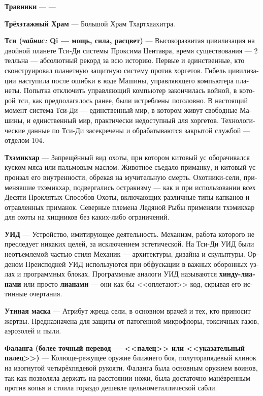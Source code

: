 \documentclass[a4paper,12pt,fleqn]{book}\usepackage{cooltooltips}\usepackage{polyglossia}\setdefaultlanguage[babelshorthands=true]{russian}\setotherlanguage{english}\defaultfontfeatures{Ligatures=TeX,Mapping=tex-text} \usepackage{xcolor}\definecolor{lightgray}{HTML}{bbbbbb}\color{lightgray}\newcommand{\ml}[3]{\textenglish{\textcolor{black}{#3}}}
\newcommand{\theterm}[3]{\textbf{\hypertarget{#1}{#2}} --- #3}
\newcommand{\theorigin}[3]{\textit{#1:} #2 --- #3}
\begin{document}
{\theterm{grasshider}
{Травники}
{---}

\theterm{three-storey-temple} %
{Трёхэтажный Храм}
{Большой Храм Тхартхаахитра.}

\theterm{qi-people}
{Тси (\theorigin{чайнис}{Qi}{мощь, сила, расцвет})}
{Высокоразвитая цивилизация на двойной планете Тси-Ди системы Проксима Центавра, время существования --- 2 телльна --- абсолютный рекорд за всю историю.
Первые и единственные, кто сконструировал планетную защитную систему против хоргетов.
Гибель цивилизации наступила после ошибки в коде Машины, управляющего компьютера планеты.
Попытка отключить управляющий компьютер закончилась войной, в которой тси, как предполагалось ранее, были истреблены поголовно.
В настоящий момент система Тси-Ди --- единственный мир, в котором живут свободные Машины, и единственный мир, практически недоступный для хоргетов.
Технологические данные по Тси-Ди засекречены и обрабатываются закрытой службой --- отделом 104.}

\theterm{tchoemikchar}
{Тхэмикхар}
{Запрещённый вид охоты, при котором китовый ус оборачивался куском мяса или пальмовым маслом.
Животное съедало приманку, и китовый ус пронзал его внутренности, обрекая на мучительную смерть.
Охотники-сели, применявшие тхэмикхар, подвергались остракизму --- как и при использовании всех Десяти Проклятых Способов Охоты, включающих различные типы капканов и отравленных приманок.
Северные племена Ледяной Рыбы применяли тхэмикхар для охоты на хищников без каких-либо ограничений.}

\theterm{AID}
{УИД}
{Устройство, имитирующее деятельность.
Механизм, работа которого не преследует никаких целей, за исключением эстетической.
На Тси-Ди УИД были неотъемлемой частью стиля Механик --- архитектуры, дизайна и скульптуры.
Орденом Преисподней УИД используются при обфускации в важных оборонных узлах и программных блоках.
Программные аналоги УИД называются \textbf{хинду-лианами} или просто \textbf{лианами} --- они как бы <<оплетают>> код, скрывая его истинные очертания.}

\theterm{duck-mask}
{Утиная маска}
{Атрибут жреца сели, в основном врачей и тех, кто приносит жертвы.
Предназначена для защиты от патогенной микрофлоры, токсичных газов, аэрозолей и пыли.}

\theterm{phalanx}
{Фаланга (более точный перевод --- <<палец>> или <<указательный палец>>)}
{Колюще-режущее оружие ближнего боя, полуторапядевый клинок на изогнутой четырёхпядевой рукояти.
Фаланга была основным оружием воинов, так как позволяла держать на расстоянии ножи, была достаточно манёвренным против копья и стоила гораздо дешевле цельнометаллической сабли.}

}
\end{document}
